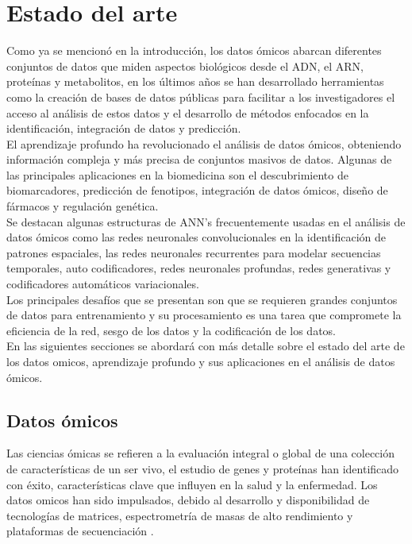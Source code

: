 \section{Estado del arte}


Como ya se mencionó en la introducción, los datos ómicos abarcan diferentes conjuntos de datos que miden aspectos biológicos desde el ADN, el ARN, proteínas y metabolitos, en los últimos años se han desarrollado herramientas como la creación de bases de datos públicas para facilitar a los investigadores el acceso al análisis de estos datos y el desarrollo de métodos enfocados en la identificación, integración de datos y predicción.\\

El aprendizaje profundo ha revolucionado el análisis de datos ómicos, obteniendo información compleja y más precisa de conjuntos masivos de datos. Algunas de las principales aplicaciones en la biomedicina son el descubrimiento de biomarcadores, predicción de fenotipos, integración de datos ómicos, diseño de fármacos y regulación genética.\\

Se destacan algunas estructuras de ANN’s frecuentemente usadas en el análisis de datos ómicos como las redes neuronales convolucionales en la identificación de patrones espaciales, las redes neuronales recurrentes para modelar secuencias temporales, auto codificadores, redes neuronales profundas, redes generativas y codificadores automáticos variacionales.\\

Los principales desafíos que se presentan son que se requieren grandes conjuntos de datos para entrenamiento y su procesamiento es una tarea que compromete la eficiencia de la red, sesgo de los datos y la codificación de los datos.\\

En las siguientes secciones se abordará con más detalle sobre el estado del arte de los datos omicos, aprendizaje profundo y sus aplicaciones en el análisis de datos ómicos.

\subsection{Datos ómicos}

Las ciencias ómicas se refieren a la evaluación integral o global de una colección de características de un ser vivo, el estudio de genes y proteínas han identificado con éxito, características clave que influyen en la salud y la enfermedad. Los datos omicos han sido impulsados, debido al desarrollo y disponibilidad de tecnologías de matrices, espectrometría de masas de alto rendimiento y plataformas de secuenciación \citep{hasin2017multi}.\\

